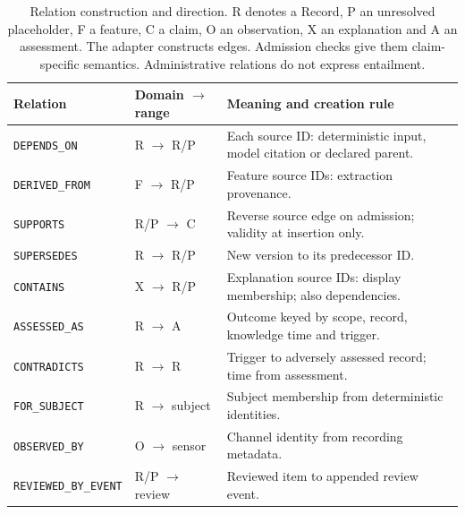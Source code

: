 \begin{table}[!htbp]
\caption{Relation construction and direction. R denotes a Record, P an unresolved
placeholder, F a feature, C a claim, O an observation, X an explanation and A an
assessment. The adapter constructs edges. Admission checks give them claim-specific
semantics. Administrative relations do not express entailment.}
\label{tab:relations}
\centering\footnotesize\setlength{\tabcolsep}{3pt}
\begin{tabularx}{\textwidth}{l l X}
\toprule Relation & Domain $\to$ range & Meaning and creation rule\\\midrule
\texttt{DEPENDS\_ON} & R $\to$ R/P & Each source ID: deterministic input, model citation or declared parent.\\
\texttt{DERIVED\_FROM} & F $\to$ R/P & Feature source IDs: extraction provenance.\\
\texttt{SUPPORTS} & R/P $\to$ C & Reverse source edge on admission; validity at insertion only.\\
\texttt{SUPERSEDES} & R $\to$ R/P & New version to its predecessor ID.\\
\texttt{CONTAINS} & X $\to$ R/P & Explanation source IDs: display membership; also dependencies.\\
\texttt{ASSESSED\_AS} & R $\to$ A & Outcome keyed by scope, record, knowledge time and trigger.\\
\texttt{CONTRADICTS} & R $\to$ R & Trigger to adversely assessed record; time from assessment.\\
\texttt{FOR\_SUBJECT} & R $\to$ subject & Subject membership from deterministic identities.\\
\texttt{OBSERVED\_BY} & O $\to$ sensor & Channel identity from recording metadata.\\
\texttt{REVIEWED\_BY\_EVENT} & R/P $\to$ review & Reviewed item to appended review event.\\
\bottomrule
\end{tabularx}
\end{table}

